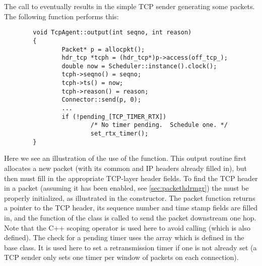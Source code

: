 The call to  eventually results in the simple TCP sender
generating some packets.  The following function 
performs this:
\begin{small}
\begin{verbatim}
        void TcpAgent::output(int seqno, int reason)
        {
                Packet* p = allocpkt();
                hdr_tcp *tcph = (hdr_tcp*)p->access(off_tcp_);
                double now = Scheduler::instance().clock();
                tcph->seqno() = seqno;
                tcph->ts() = now;
                tcph->reason() = reason;
                Connector::send(p, 0);
                ...
                if (!pending_[TCP_TIMER_RTX])
                        /* No timer pending.  Schedule one. */
                        set_rtx_timer();
        }
\end{verbatim}
\end{small}
Here we see an illustration of the use of the 
function.
This output routine first allocates a new packet
(with its common and IP headers already filled in), but then must fill
in the appropriate TCP-layer header fields.
To find the TCP header in a packet (assuming it has been enabled, see
\ref{sec:packethdrmgr}) the  must be properly initialized,
as illustrated in the constructor.
The packet  function returns a pointer to the TCP
header, its sequence number and time stamp fields are filled in,
and the  function of the  class is called
to send the packet downstream one hop.
Note that the C++ \code{::} scoping operator is used here to avoid
calling  (which is also defined).
The check for a pending timer uses the array  which
is defined in the  base class.
It is used here to set a retransmission timer if one is not already set
(a TCP sender only sets one timer per window of packets on each connection).

\subsection{}

